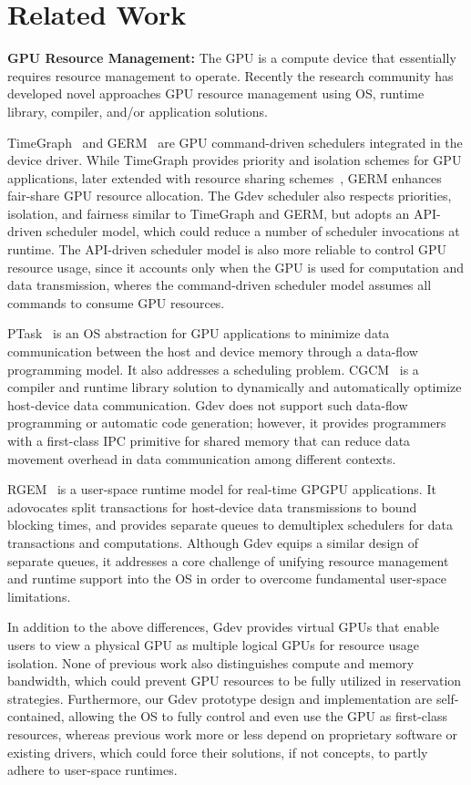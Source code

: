 \section{Related Work}
\label{related_work}

\textbf{GPU Resource Management:}
The GPU is a compute device that essentially requires resource management
to operate.
Recently the research community has developed novel approaches GPU
resource management using OS, runtime library, compiler, and/or
application solutions.

TimeGraph~\cite{Kato_ATC11} and GERM~\cite{Bautin_MCNC08} are GPU
command-driven schedulers integrated in the device driver.
While TimeGraph provides priority and isolation schemes for
GPU applications, later extended with resource sharing
schemes~\cite{Kato_RTAS11}, GERM enhances fair-share GPU resource
allocation.
The Gdev scheduler also respects priorities, isolation, and fairness
similar to TimeGraph and GERM, but adopts an API-driven scheduler model,
which could reduce a number of scheduler invocations at runtime.
The API-driven scheduler model is also more reliable to control GPU
resource usage, since it accounts only when the GPU is used
for computation and data transmission, wheres the command-driven
scheduler model assumes all commands to consume GPU resources.

PTask~\cite{Rossbach_SOSP11} is an OS abstraction for GPU applications
to minimize data communication between the host and device memory
through a data-flow programming model.
It also addresses a scheduling problem.
CGCM~\cite{Jablin_PLDI11} is a compiler and runtime library solution to
dynamically and automatically optimize host-device data communication.
Gdev does not support such data-flow programming or automatic code
generation; however, it provides programmers with a first-class IPC
primitive for shared memory that can reduce data movement overhead in
data communication among different contexts.

RGEM~\cite{Kato_RTSS11} is a user-space runtime model for real-time
GPGPU applications.
It adovocates split transactions for host-device data transmissions
to bound blocking times, and provides separate queues to demultiplex
schedulers for data transactions and computations.
Although Gdev equips a similar design of separate queues, it
addresses a core challenge of unifying resource management
and runtime support into the OS in order to overcome fundamental
user-space limitations.

In addition to the above differences, Gdev provides virtual GPUs that
enable users to view a physical GPU as multiple logical GPUs for
resource usage isolation.
None of previous work also distinguishes compute and memory bandwidth,
which could prevent GPU resources to be fully utilized in
reservation strategies.
Furthermore, our Gdev prototype design and implementation are
self-contained, allowing the OS to fully control and even use the GPU as
first-class resources, whereas previous work more or less 
depend on proprietary software or existing drivers, which could force their
solutions, if not concepts, to partly adhere to user-space runtimes.

